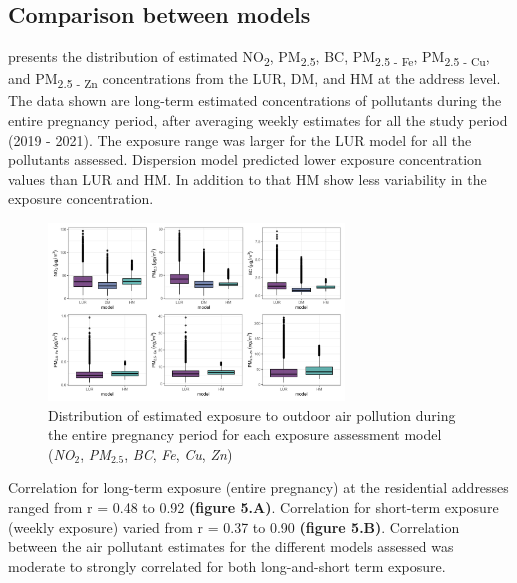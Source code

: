 \documentclass{article}
\begin{document}
\subsection{Comparison between models} %

\textbf{} presents the distribution of estimated NO\textsubscript{2}, PM\textsubscript{2.5}, BC,  PM\textsubscript{2.5 - Fe}, PM\textsubscript{2.5 - Cu}, and PM\textsubscript{2.5 - Zn} concentrations from the LUR, DM, and HM at the address level. The data shown are long-term estimated concentrations of pollutants during the entire pregnancy period, after averaging weekly estimates for all the study period (2019 - 2021). The exposure range was larger for the LUR model for all the pollutants assessed. Dispersion model predicted lower exposure concentration values than LUR and HM. In addition to that HM show less variability in the exposure concentration. 

\begin{figure}[!htb]
\includegraphics[width=0.7\textwidth]{figures/boxplot_all_models_estimates.png}
\caption{Distribution of estimated exposure to outdoor air pollution during the entire pregnancy period for each exposure assessment model (\textit{NO$_2$}, \textit{PM$_{2.5}$}, \textit{BC}, \textit{Fe}, \textit{Cu}, \textit{Zn})}
\label{fig4}
\end{figure}

Correlation for long-term exposure (entire pregnancy) at the residential addresses ranged from r = 0.48 to 0.92 \textbf{(figure 5.A)}. Correlation for short-term exposure (weekly exposure) varied from r = 0.37 to 0.90 \textbf{(figure 5.B)}. Correlation between the air pollutant estimates for the different models assessed was moderate to strongly correlated for both long-and-short term exposure. 
\end{document}
